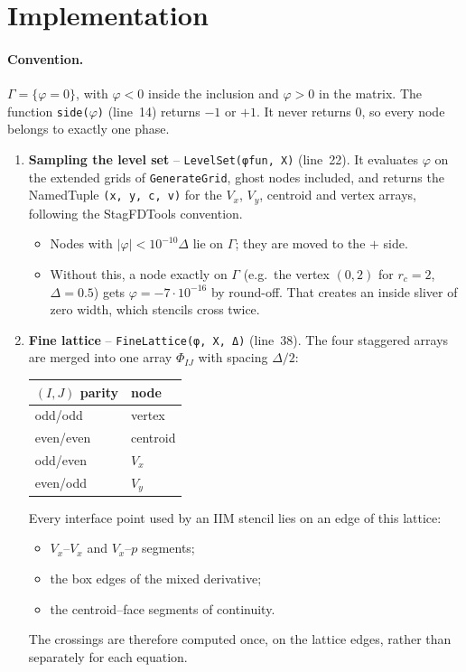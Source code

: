 \documentclass[11pt,a4paper]{article}
\newcommand{\code}[1]{\texttt{#1}}
\begin{document}
\section{Implementation}

\paragraph{Convention.} $\Gamma=\{\varphi=0\}$, with $\varphi<0$ inside the inclusion and
$\varphi>0$ in the matrix. The function \code{side($\varphi$)} (line~14) returns $-1$ or $+1$.
It never returns 0, so every node belongs to exactly one phase.

\begin{enumerate}[leftmargin=*]
\item \textbf{Sampling the level set} -- \code{LevelSet(φfun, X)} (line~22).
  It evaluates $\varphi$ on the extended grids of \code{GenerateGrid}, ghost nodes included,
  and returns the NamedTuple \code{(x, y, c, v)} for the $V_x$, $V_y$, centroid and vertex
  arrays, following the StagFDTools convention.
  \begin{itemize}
    \item Nodes with $|\varphi|<10^{-10}\Delta$ lie on $\Gamma$; they are moved to the $+$ side.
    \item Without this, a node exactly on $\Gamma$ (e.g.\ the vertex $(0,2)$ for $r_c=2$,
      $\Delta=0.5$) gets $\varphi=-7\cdot10^{-16}$ by round-off. That creates an inside sliver
      of zero width, which stencils cross twice.
  \end{itemize}

\item \textbf{Fine lattice} -- \code{FineLattice(φ, X, Δ)} (line~38).
  The four staggered arrays are merged into one array $\Phi_{IJ}$ with spacing $\Delta/2$:
  \begin{center}
  \begin{tabular}{@{}ll@{}}
    \toprule
    $(I,J)$ parity & node \\
    \midrule
    odd/odd & vertex \\
    even/even & centroid \\
    odd/even & $V_x$ \\
    even/odd & $V_y$ \\
    \bottomrule
  \end{tabular}
  \end{center}
  Every interface point used by an IIM stencil lies on an edge of this lattice:
  \begin{itemize}
    \item $V_x$--$V_x$ and $V_x$--$p$ segments;
    \item the box edges of the mixed derivative;
    \item the centroid--face segments of continuity.
  \end{itemize}
  The crossings are therefore computed once, on the lattice edges, rather than separately for
  each equation.


\end{enumerate}
\end{document}
